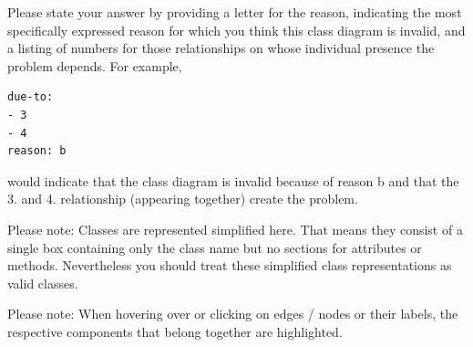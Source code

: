Please state your answer by providing a letter for the reason, indicating the most specifically expressed reason for which you think this class diagram is invalid, and a listing of numbers for those relationships on whose individual presence the problem depends. For example,


\begin{verbatim}
due-to:
- 3
- 4
reason: b

\end{verbatim}


would indicate that the class diagram is invalid because of reason b and that the 3. and 4. relationship (appearing together) create the problem.



Please note: Classes are represented simplified here. 
 That means they consist of a single box containing only the class name but no sections for attributes or methods. 
 Nevertheless you should treat these simplified class representations as valid classes.

Please note: When hovering over or clicking on edges / nodes or their labels, the respective components that belong together are highlighted.

